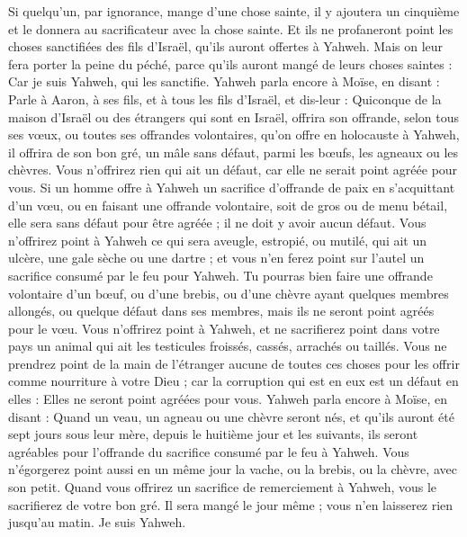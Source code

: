 \begin{multicols}{2}
Si quelqu'un, par ignorance, mange d'une chose sainte, il y ajoutera un cinquième et le donnera au sacrificateur avec la chose sainte.
Et ils ne profaneront point les choses sanctifiées des fils d'Israël, qu'ils auront offertes à Yahweh.
Mais on leur fera porter la peine du péché, parce qu'ils auront mangé de leurs choses saintes : Car je suis Yahweh, qui les sanctifie.
Yahweh parla encore à Moïse, en disant :
Parle à Aaron, à ses fils, et à tous les fils d'Israël, et dis-leur : Quiconque de la maison d'Israël ou des étrangers qui sont en Israël, offrira son offrande, selon tous ses vœux, ou toutes ses offrandes volontaires, qu’on offre en holocauste à Yahweh,
il offrira de son bon gré, un mâle sans défaut, parmi les bœufs, les agneaux ou les chèvres.
Vous n'offrirez rien qui ait un défaut, car elle ne serait point agréée pour vous.
Si un homme offre à Yahweh un sacrifice d’offrande de paix en s'acquittant d’un vœu, ou en faisant une offrande volontaire, soit de gros ou de menu bétail, elle sera sans défaut  pour être agréée ; il ne doit y avoir aucun défaut.
Vous n'offrirez point à Yahweh ce qui sera aveugle, estropié, ou mutilé, qui ait un ulcère, une gale sèche ou une dartre ; et vous n'en ferez point sur l’autel un sacrifice consumé par le feu pour Yahweh.
Tu pourras bien faire une offrande volontaire d'un bœuf, ou d'une brebis, ou d'une chèvre ayant quelques membres allongés, ou quelque défaut dans ses membres, mais ils ne seront point agréés pour le vœu.
Vous n'offrirez point à Yahweh, et ne sacrifierez point dans votre pays un animal qui ait les testicules froissés, cassés, arrachés ou taillés.
Vous ne prendrez point de la main de l'étranger aucune de toutes ces choses pour les offrir comme nourriture à votre Dieu ; car la corruption qui est en eux est un défaut en elles : Elles ne seront point agréées pour vous.
Yahweh parla encore à Moïse, en disant :
Quand un veau, un agneau ou une chèvre seront nés, et qu'ils auront été sept jours sous leur mère, depuis le huitième jour et les suivants, ils seront agréables pour l'offrande du sacrifice consumé par le feu à Yahweh.
Vous n'égorgerez point aussi en un même jour la vache, ou la brebis, ou la chèvre, avec son petit.
Quand vous offrirez un sacrifice de remerciement à Yahweh, vous le sacrifierez de votre bon gré.
Il sera mangé le jour même ; vous n'en laisserez rien jusqu'au matin. Je suis Yahweh.

\end{multicols}
